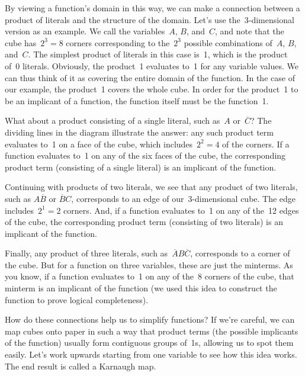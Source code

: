 \pagebreak

By viewing a function's domain in this way, we can make a connection
between a product of literals and the structure of the domain.  Let's
use the~\mbox{3-dimensional} version as an example.  We call the 
variables~$A$, $B$, and~$C$, and note that the cube has~$2^3=8$ corners
corresponding to the~$2^3$ possible combinations
of~$A$, $B$, and~$C$.
The simplest product of literals in this
case is~1, which is the product of~0 literals.  Obviously, the product~1 
evaluates to~1 for any variable values.  We can thus think of it as
covering the entire domain of the function.  In the case of our example,
the product~1 covers the whole cube.  In order for the product~1 to 
be an implicant of a function, the function itself must be the function~1.

What about a product consisting of a single literal, such as~$A$ 
or~$\overline{C}$?  The dividing lines in the diagram illustrate the
answer: any such product term evaluates to~1 on a face of the cube,
which includes~$2^2=4$ of the corners.  If a function evaluates to~1
on any of the six faces of the cube, the corresponding product term
(consisting of a single literal) is an implicant of the function.

Continuing with products of two literals, we see that any product of 
two literals, such as $A\overline{B}$ or $\overline{B}C$, corresponds
to an edge of our~\mbox{3-dimensional} cube.  The edge includes~$2^1=2$
corners.  And, if a function evaluates to~1 on any of the~12 edges
of the cube, the corresponding product term (consisting of two literals)
is an implicant of the function.

Finally, any product of three literals, such as~$\overline{A}B\overline{C}$,
corresponds to a corner of the cube.  But for a function on three variables,
these are just the minterms.  As you know, if a function evaluates to~1
on any of the~8 corners of the cube, that minterm is an implicant of the
function (we used this idea to construct the function to prove
logical completeness).

How do these connections help us to simplify functions?  If we're
careful, we can map cubes onto paper in such a way that product terms
(the possible implicants of the function) usually form contiguous 
groups of~1s, allowing us to spot them easily.  Let's work upwards
starting from one variable to see how this idea works.  The end result
is called a Karnaugh map.

